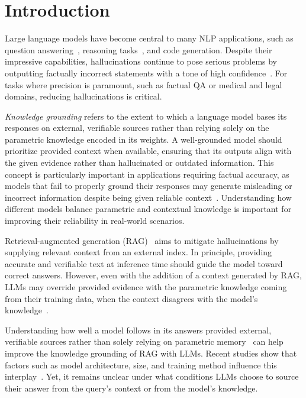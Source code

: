 \section{Introduction}

Large language models have become central to many NLP applications, such as question answering~\cite{gpt3,how_can_we_know}, reasoning tasks~\cite{treeofthoughts}, and code generation\cite{alphacode_generation}.
Despite their impressive capabilities, hallucinations continue to pose serious problems by outputting factually incorrect statements with a tone of high confidence~\cite{how_can_we_know}.
For tasks where precision is paramount, such as factual QA or medical and legal domains, reducing hallucinations is critical\cite{mitigating_hallucinations}.

\emph{Knowledge grounding} refers to the extent to which a language model bases its responses on external, verifiable sources rather than relying solely on the parametric knowledge encoded in its weights. 
A well-grounded model should prioritize provided context when available, ensuring that its outputs align with the given evidence rather than hallucinated or outdated information. 
This concept is particularly important in applications requiring factual accuracy, as models that fail to properly ground their responses may generate misleading or incorrect information despite being given reliable context~\cite{rag,factual_recall}.
Understanding how different models balance parametric and contextual knowledge is important for improving their reliability in real-world scenarios.

Retrieval-augmented generation (RAG)~\cite{rag} aims to mitigate hallucinations by supplying relevant context from an external index.
In principle, providing accurate and verifiable text at inference time should guide the model toward correct answers.
However, even with the addition of a context generated by RAG, LLMs may override provided evidence with the parametric knowledge coming from their training data, %
when the context disagrees with the model's knowledge~\cite{factual_recall,ragged}.

Understanding how well a model follows in its answers provided external, verifiable sources rather than solely relying on parametric memory~\cite{rag} can help improve the knowledge grounding of RAG with LLMs. 
Recent studies show that factors such as model architecture, size, and training method influence this interplay~\cite{factual_recall,flant5,llama}.
Yet, it remains unclear under what conditions LLMs choose to source their answer from the query's context or from the model's knowledge.


